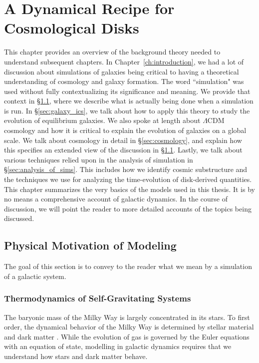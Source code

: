 \newcommand{\deriv}[3][]{%
  \ensuremath{\frac{\partial^{#1} {#2}}{\partial {#3}^{#1}}}}
\newtheorem{theorem}{Theorem}[section]

\chapter{A Dynamical Recipe for Cosmological Disks}\label{ch:background}

This chapter provides an overview of the background theory needed to understand subsequent chapters. In Chapter~\ref{ch:introduction}, we had a lot of discussion about simulations of galaxies being critical to having a theoretical understanding of cosmology and galaxy formation. The word ``simulation" was used without fully contextualizing its significance and meaning. We provide that context in \S\ref{sec:motivation}, where we describe what is actually being done when a simulation is run. In \S\ref{sec:galaxy_ics}, we talk about how to apply this theory to study the evolution of equilibrium galaxies. We also spoke at length about $\Lambda$CDM cosmology and how it is critical to explain the evolution of galaxies on a global scale. We talk about cosmology in detail in \S\ref{sec:cosmology}, and explain how this specifies an extended view of the discussion in \S\ref{sec:motivation}. Lastly, we talk about various techniques relied upon in the analysis of simulation in \S\ref{sec:analysis_of_sims}. This includes how we identify cosmic substructure and the techniques we use for analyzing the time-evolution of disk-derived quantities. This chapter summarizes the very basics of the models used in this thesis. It is by no means a comprehensive account of galactic dynamics. In the course of discussion, we will point the reader to more detailed accounts of the topics being discussed.

\section{Physical Motivation of Modeling} \label{sec:motivation}

The goal of this section is to convey to the reader what we mean by a simulation of a galactic system. 

\subsection{Thermodynamics of Self-Gravitating Systems}

The baryonic mass of the Milky Way is largely concentrated in its stars. To first order, the dynamical behavior of the Milky Way is determined by stellar material and dark matter \citep{BM}. While the evolution of gas is governed by the Euler equations with an equation of state, modelling in galactic dynamics requires that we understand how stars and dark matter behave. 

